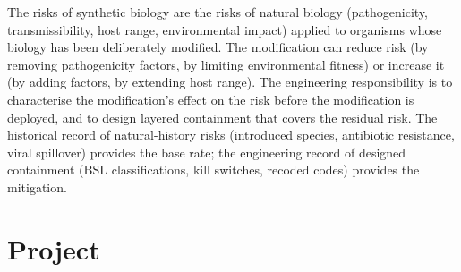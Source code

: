 \begin{principle}
The risks of synthetic biology are the risks of natural biology
(pathogenicity, transmissibility, host range, environmental impact)
applied to organisms whose biology has been deliberately modified.
The modification can reduce risk (by removing pathogenicity factors,
by limiting environmental fitness) or increase it (by adding
factors, by extending host range). The engineering responsibility
is to characterise the modification's effect on the risk before the
modification is deployed, and to design layered containment that
covers the residual risk. The historical record of natural-history
risks (introduced species, antibiotic resistance, viral spillover)
provides the base rate; the engineering record of designed
containment (BSL classifications, kill switches, recoded codes)
provides the mitigation.
\end{principle}

\section{Project}


